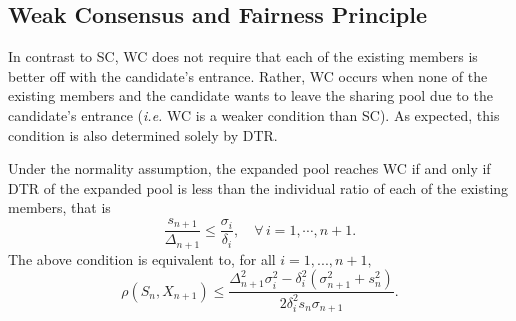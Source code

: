 \documentclass[fleqn,mnsc,nonblindrev]{informs4}
\begin{document}
\subsection{Weak Consensus and Fairness Principle }\label{sec:weakconsensus}
In contrast to SC, WC does not require that each of the existing members is better off with the candidate's entrance. Rather, WC occurs when none of the existing members and the candidate wants to leave the sharing pool due to the candidate's entrance (\textit{i.e.} WC is a weaker condition than SC). As expected, this condition is also determined solely by DTR. 
\begin{theorem}\label{thm:weakconsensus}
Under the normality assumption, the expanded pool reaches WC if and only if DTR of the expanded pool is less than the individual ratio of each of the existing members, that is  
\begin{equation}\label{eq:weakratio}
\frac{s_{n+1}}{\Delta_{n+1}}
\leq \frac{\sigma_{i}}{\delta_i},\quad\forall\, i=1,\cdots, n+1.
\end{equation}
The above condition is equivalent to, for all $i=1,...,n+1,$
\begin{equation}\label{eq:weakcorr}
\rho(S_n,X_{n+1})\leq\frac{\Delta_{n+1}^2\sigma_i^2-\delta_i^2(\sigma_{n+1}^2+s_{n}^2)}{2\delta_i^2s_n\sigma_{n+1}}.
\end{equation}

\end{theorem}
\end{document}
